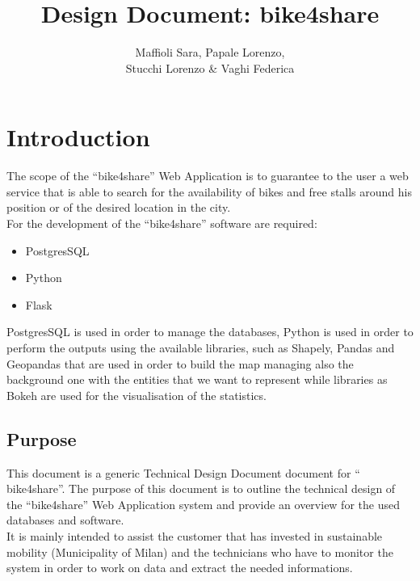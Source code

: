 \documentclass{article}
\title{Design Document: bike4share}
\author{Maffioli Sara, Papale Lorenzo, \\ Stucchi Lorenzo \& Vaghi Federica}
\begin{document}
\maketitle
\tableofcontents

\newpage

\section{Introduction}

The scope of the “bike4share” Web Application is to guarantee to the user a web service that is able to search for the availability of bikes and free stalls around his position or of the desired location in the city.\\
For the development of the “bike4share” software are required:
\begin{itemize}
    \item PostgresSQL 
    \item Python
    \item Flask
\end{itemize}
 PostgresSQL is used in order to manage the databases, Python is used in order to perform the outputs using the available libraries, such as Shapely, Pandas and Geopandas that are used in order to build the map managing also the background one with the entities that we want to represent while libraries as Bokeh are used for the visualisation of the statistics.

\subsection{Purpose}
This document is a generic Technical Design Document document for “ bike4share”. The purpose of this document is to outline the technical design of the “bike4share” Web Application system and provide an overview for the used databases and software.\\
It is mainly  intended to assist the customer that has invested in sustainable mobility (Municipality of Milan) and the technicians who have to monitor the system in order to work on data and extract the needed informations.
\end{document}
